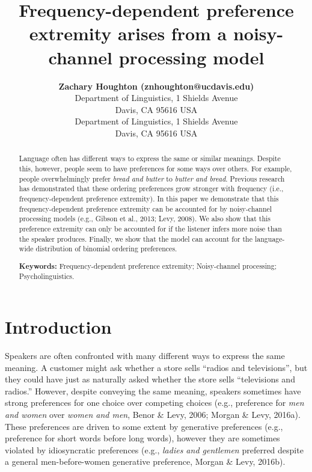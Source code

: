 \documentclass[10pt, letterpaper, hidelinks]{article}
\title{Frequency-dependent preference extremity arises from a
noisy-channel processing model}
\author{{\large \bf Zachary Houghton (znhoughton@ucdavis.edu)} \\ Department of Linguistics, 1 Shields Avenue \\ Davis, CA 95616 USA \AND {\large \bf Emily Morgan (eimorgan@ucdavis.edu)} \\ Department of Linguistics, 1 Shields Avenue \\ Davis, CA 95616 USA}
\begin{document}
\maketitle

\begin{abstract}
Language often has different ways to express the same or similar
meanings. Despite this, however, people seem to have preferences for
some ways over others. For example, people overwhelmingly prefer
\emph{bread and butter} to \emph{butter and bread}. Previous research
has demonstrated that these ordering preferences grow stronger with
frequency (i.e., frequency-dependent preference extremity). In this
paper we demonstrate that this frequency-dependent preference extremity
can be accounted for by noisy-channel processing models (e.g., Gibson et
al., 2013; Levy, 2008). We also show that this preference extremity can
only be accounted for if the listener infers more noise than the speaker
produces. Finally, we show that the model can account for the
language-wide distribution of binomial ordering preferences.

\textbf{Keywords:}
Frequency-dependent preference extremity; Noisy-channel processing;
Psycholinguistics.
\end{abstract}


\hypertarget{introduction}{%
\section{Introduction}\label{introduction}}

Speakers are often confronted with many different ways to express the
same meaning. A customer might ask whether a store sells ``radios and
televisions'', but they could have just as naturally asked whether the
store sells ``televisions and radios.'' However, despite conveying the
same meaning, speakers sometimes have strong preferences for one choice
over competing choices (e.g., preference for \emph{men and women} over
\emph{women and men}, Benor \& Levy, 2006; Morgan \& Levy, 2016a). These
preferences are driven to some extent by generative preferences (e.g.,
preference for short words before long words), however they are
sometimes violated by idiosyncratic preferences (e.g., \emph{ladies and
gentlemen} preferred despite a general men-before-women generative
preference, Morgan \& Levy, 2016b).
\end{document}
